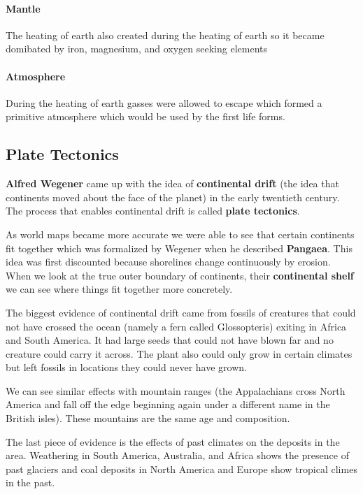 \documentclass{article}
\begin{document}
\paragraph{Mantle} The heating of earth also created during the heating of earth so it became domibated by iron, magnesium, and oxygen seeking elements

\paragraph{Atmosphere} During the heating of earth gasses were allowed to escape which formed a primitive atmosphere which would be used by the first life forms.

\subsection{Plate Tectonics} %
\label{sub:plate_tectonics}
\textbf{Alfred Wegener} came up with the idea of \textbf{continental drift} (the idea that continents moved about the face of the planet) in the early twentieth century. The process that enables continental drift is called \textbf{plate tectonics}.

As world maps became more accurate we were able to see that certain continents fit together which was formalized by Wegener when he described \textbf{Pangaea}. This idea was first discounted because shorelines change continuously by erosion. When we look at the true outer boundary of continents, their \textbf{continental shelf} we can see where things fit together more concretely.

The biggest evidence of continental drift came from fossils of creatures that could not have crossed the ocean (namely a fern called Glossopteris) exiting in Africa and South America. It had large seeds that could not have blown far and no creature could carry it across. The plant also could only grow in certain climates but left fossils in locations they could never have grown.

We can see similar effects with mountain ranges (the Appalachians cross North America and fall off the edge beginning again under a different name in the British isles). These mountains are the same age and composition.

The last piece of evidence is the effects of past climates on the deposits in the area. Weathering in South America, Australia, and Africa shows the presence of past glaciers and coal deposits in North America and Europe show tropical climes in the past.
\end{document}
